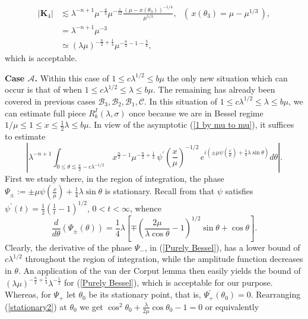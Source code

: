 \documentclass[11pt, reqno]{amsart}
\theoremstyle{plain}
\theoremstyle{remark}
\theoremstyle{example}
\theoremstyle{definition}
\numberwithin{equation}{section}
\begin{document}
\begin{equation*}
  \begin{split}
 |\textbf{K}_{4}| & \lesssim \lambda^{-n+1} \mu^{-\frac{4}{3} } \mu^{- \frac{1}{12}} \frac{  \left(  \mu - x(\theta_{3}) \right)^{-1/4}  }{ \mu^{5/3} }, \ \ \  (\, x(\theta_{3})= \mu - \mu^{1/3} \,), \\
 & = \lambda^{-n+1} \mu^{-3} \\
  & \simeq (\lambda \mu )^{-\frac{n}{2} + \frac{1}{4} } \mu^{-\frac{n}{2} - 1 - \frac{3}{4}},
  \end{split}
\end{equation*}
which is acceptable.

\noindent \textbf{Case $\mathcal{A}$.} Within this case of $1 \leq  c \lambda^{1/2}  \leq b \mu$ the only new situation which can occur is that of when $1 \leq  c \lambda^{1/2} \leq \lambda \leq b \mu$. The remaining has already been covered in previous cases $\mathcal{B}_{3},\mathcal{B}_{2},\mathcal{B}_{1}, \mathcal{C}$. In this situation of $1 \leq  c \lambda^{1/2} \leq \lambda \leq b \mu$, we can estimate full piece $R_{k}^{I}(\lambda, \sigma)$ once because we are in Bessel regime $1 / \mu \leq 1 \leq x  \leq \frac{1}{2} \lambda \leq b \mu$. In view of the asymptotic (\ref{1 by mu to mu}), it suffices to estimate
\begin{equation}\label{Purely Bessel}
   \left| \lambda^{-n+1}  \int_{0 \leq \theta \lesssim \frac{\pi}{2} - c \lambda^{-1/2}} \,   x^{\frac{n}{2}-1} \mu^{-\frac{n}{2}+\frac{1}{2}} \, \psi^{\prime}({\textstyle\frac{x}{\mu}})^{-1/2}   \, e^{i \left( \pm \mu   \psi \left({\textstyle\frac{x}{\mu}} \right)   + \frac{1}{4} \lambda \sin{\theta}  \right) }    d \theta \right|.
\end{equation}
First we study where, in the region of integration, the phase $\Psi_{\pm}:= \pm \mu   \psi \left({\textstyle\frac{x}{\mu}} \right)   + \frac{1}{4} \lambda \sin{\theta}$ is stationary. Recall from \cite[page 697]{Askey-Wainger} that $\psi$ satisfies $ \psi^{\prime}(t)= {\textstyle\frac{1}{2}}\left(  \frac{1}{t} -1 \right)^{1/2}$, $0<t<\infty$, whence
\begin{equation}\label{stationary2}
    \frac{d}{d \theta} \left( \Psi_{\pm} (\theta)  \right)=  \frac{1}{4} \lambda  \left[ \mp \left(  \frac{2 \mu}{ \lambda \cos{\theta}} -1 \right)^{1/2} \sin{\theta} + \cos{ \theta} \right].
\end{equation}
Clearly, the derivative of the phase $\Psi_{-}$, in (\ref{Purely Bessel}), has a lower bound of $c \lambda^{1/2}$ throughout the region of integration, while the amplitude function decreases in $\theta$. An application of the van der Corput lemma then easily yields the bound of $(\lambda \mu)^{-\frac{n}{2} + \frac{1}{4}} \lambda^{-\frac{1}{2}}$ for (\ref{Purely Bessel}), which is acceptable for our purpose. Whereas, for $\Psi_{+}$ let $\theta_{0}$ be its stationary point, that is, $  \Psi_{+}^{\prime}  (\theta_{0} )=0$. Rearranging (\ref{stationary2}) at $\theta_{0}$ we get $\cos^{2}{\theta_{0}} + \frac{\lambda}{2 \mu} \cos{\theta_{0}} -1 =0$ or equivalently 
\end{document}
